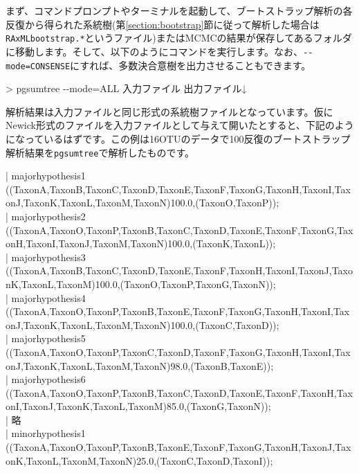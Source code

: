 \documentclass[titlepage,10pt,a4paper]{jsbook}
\newenvironment{content}{\begin{shaded}\vspace{-1em}\raggedright\ttfamily\footnotesize\setlength{\baselineskip}{1.4em}}{\end{shaded}\vspace{-1em}}
\newenvironment{cmd}{\begin{oframed}\raggedright\ttfamily\footnotesize\setlength{\baselineskip}{1.4em}}{\end{oframed}\vspace{-1em}}
\begin{document}
まず、コマンドプロンプトやターミナルを起動して、ブートストラップ解析の各反復から得られた系統樹(第\ref{section:bootstrap}節に従って解析した場合は\texttt{RAxML{\textunderscore}bootstrap.*}というファイル)またはMCMCの結果が保存してあるフォルダに移動します。そして、以下のようにコマンドを実行します。なお、\texttt{{-}{-}mode=CONSENSE}にすれば、多数決合意樹を出力させることもできます。
\begin{cmd}
{\textgreater} pgsumtree {-}{-}mode=ALL 入力ファイル 出力ファイル↓
\end{cmd}
解析結果は入力ファイルと同じ形式の系統樹ファイルとなっています。仮にNewick形式のファイルを入力ファイルとして与えて開いたとすると、下記のようになっているはずです。この例は16OTUのデータで100反復のブートストラップ解析結果を\texttt{pgsumtree}で解析したものです。
\begin{content}
| {\lbrack}majorhypothesis{\textunderscore}1{\rbrack} ((TaxonA,TaxonB,TaxonC,TaxonD,TaxonE,TaxonF,TaxonG,TaxonH,TaxonI,TaxonJ,TaxonK,TaxonL,TaxonM,TaxonN)100.0,\linebreak(TaxonO,TaxonP));\\
| {\lbrack}majorhypothesis{\textunderscore}2{\rbrack} ((TaxonA,TaxonO,TaxonP,TaxonB,TaxonC,TaxonD,TaxonE,TaxonF,TaxonG,TaxonH,TaxonI,TaxonJ,TaxonM,TaxonN)100.0,\linebreak(TaxonK,TaxonL));\\
| {\lbrack}majorhypothesis{\textunderscore}3{\rbrack} ((TaxonA,TaxonB,TaxonC,TaxonD,TaxonE,TaxonF,TaxonH,TaxonI,TaxonJ,TaxonK,TaxonL,TaxonM)100.0,\linebreak(TaxonO,TaxonP,TaxonG,TaxonN));\\
| {\lbrack}majorhypothesis{\textunderscore}4{\rbrack} ((TaxonA,TaxonO,TaxonP,TaxonB,TaxonE,TaxonF,TaxonG,TaxonH,TaxonI,TaxonJ,TaxonK,TaxonL,TaxonM,TaxonN)100.0,\linebreak(TaxonC,TaxonD));\\
| {\lbrack}majorhypothesis{\textunderscore}5{\rbrack} ((TaxonA,TaxonO,TaxonP,TaxonC,TaxonD,TaxonF,TaxonG,TaxonH,TaxonI,TaxonJ,TaxonK,TaxonL,TaxonM,TaxonN)98.0,\linebreak(TaxonB,TaxonE));\\
| {\lbrack}majorhypothesis{\textunderscore}6{\rbrack} ((TaxonA,TaxonO,TaxonP,TaxonB,TaxonC,TaxonD,TaxonE,TaxonF,TaxonH,TaxonI,TaxonJ,TaxonK,TaxonL,TaxonM)85.0,\linebreak(TaxonG,TaxonN));\\
| 略\\
| {\lbrack}minorhypothesis{\textunderscore}1{\rbrack} ((TaxonA,TaxonO,TaxonP,TaxonB,TaxonE,TaxonF,TaxonG,TaxonH,TaxonJ,TaxonK,TaxonL,TaxonM,TaxonN)25.0,\linebreak(TaxonC,TaxonD,TaxonI));\\

\end{content}
\end{document}
